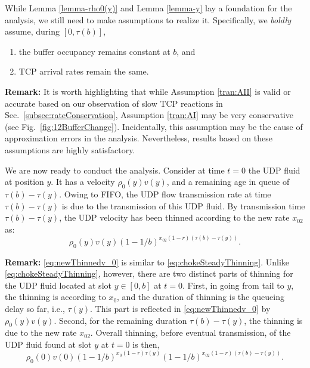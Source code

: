 \documentclass{IEEEtran}
\begin{document}
While Lemma \ref{lemma-rho0(y)} and Lemma \ref{lemma-y} lay a foundation for the analysis, we still need to make assumptions to realize it. Specifically, we {\em boldly} assume, during $[0,\tau(b)]$,
\begin{enumerate}[I: ]
\item the buffer occupancy remains constant at $b$, and \label{tran:AI}
        \item TCP arrival rates remain the same.   \label{tran:AII}
    \end{enumerate}

    {\bf Remark:} It is worth highlighting that while Assumption \ref{tran:AII} is valid or accurate based on our observation of slow TCP reactions in Sec.~\ref{subsec:rateConservation}, Assumption \ref{tran:AI} may be very conservative (see Fig.~\ref{fig:12BufferChange}). Incidentally, this assumption may be the cause of approximation errors in the analysis. Nevertheless, results based on these assumptions are highly satisfactory.


\vspace{5mm}

   We are now ready to conduct the analysis. Consider at time $t=0$ the UDP fluid at position $y$. It has a velocity $\rho_0(y)v(y)$, and a remaining age in queue of $\tau(b)-\tau(y)$. Owing to FIFO, the UDP flow transmission rate at time $\tau(b)-\tau(y)$ is due to the transmission of this UDP fluid. By transmission time $\tau(b)-\tau(y)$, the UDP velocity has been thinned according to the new rate $x_{02}$ as:
\begin{equation}\label{eq:newThinnedv_0}
        \rho_0(y)v(y)(1-1/b)^{x_{02}(1-r)(\tau(b)-\tau(y))}.
    \end{equation}

{\bf Remark:} \eqref{eq:newThinnedv_0} is similar to \eqref{eq:chokeSteadyThinning}. Unlike \eqref{eq:chokeSteadyThinning}, however, there are two distinct parts of thinning for the UDP fluid located at slot $y\in[0,b]$ at $t=0$. First, in going from tail to $y$, the thinning is according to $x_0$, and the duration of thinning is the queueing delay so far, i.e., $\tau(y)$.  This part is reflected in \eqref{eq:newThinnedv_0}  by $\rho_0(y)v(y)$. Second, for the remaining duration $\tau(b)-\tau(y)$, the thinning is due to the new rate $x_{02}$. Overall thinning, before eventual transmission, of the UDP fluid found at slot $y$  at $t=0$ is then,
\begin{equation}\nonumber
 \rho_0(0)v(0)(1-1/b)^{x_0(1-r) \tau(y)}(1-1/b)^{x_{02} (1-r)(\tau(b)-\tau(y))}.
\end{equation}
\end{document}
